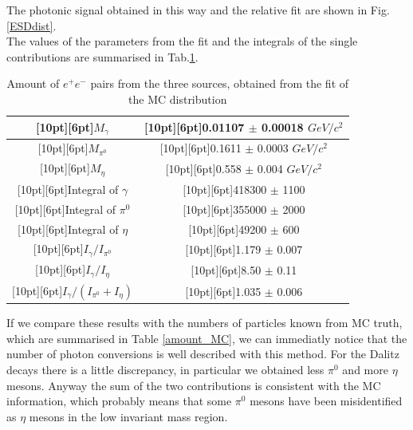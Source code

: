 \documentclass[a4paper,twocolumn,gsifonts,twoside]{gsipaper}
\begin{document}
The photonic signal obtained in this way and the relative fit are shown in Fig. \ref{ESDdist}.\\

The values of the parameters from the fit and the integrals of the single contributions are summarised in Tab.\ref{fit}.
\begin{table}[htpb]
\center
\caption{Amount of $e^{+}e^{-}$ pairs from the three sources, obtained from the fit of the MC distribution}\label{fit}
\begin{tabular}{|c|c|}
  \hline
  \raisebox{0pt}[10pt][6pt]{$M_{\gamma}$} &
  \raisebox{0pt}[10pt][6pt]{0.01107 $\pm$ 0.00018 $GeV/c^{2}$} \\
  \hline
  \raisebox{0pt}[10pt][6pt]{$M_{\pi^{0}}$} &
  \raisebox{0pt}[10pt][6pt]{0.1611 $\pm$ 0.0003 $GeV/c^{2}$} \\
  \hline
  \raisebox{0pt}[10pt][6pt]{$M_{\eta}$} &
  \raisebox{0pt}[10pt][6pt]{0.558 $\pm$ 0.004 $GeV/c^{2}$} \\
  \hline
  \raisebox{0pt}[10pt][6pt]{Integral of $\gamma$ } &
  \raisebox{0pt}[10pt][6pt]{418300 $\pm$ 1100} \\
  \hline
  \raisebox{0pt}[10pt][6pt]{Integral of $\pi^{0}$ } &
  \raisebox{0pt}[10pt][6pt]{355000 $\pm$ 2000} \\
  \hline
  \raisebox{0pt}[10pt][6pt]{Integral of $\eta$ } &
  \raisebox{0pt}[10pt][6pt]{49200 $\pm$ 600} \\
  \hline
  \raisebox{0pt}[10pt][6pt]{$I_{\gamma}/I_{\pi^{0}}$} &
  \raisebox{0pt}[10pt][6pt]{1.179 $\pm$ 0.007} \\
  \hline
  \raisebox{0pt}[10pt][6pt]{$I_{\gamma}/I_{\eta}$} &
  \raisebox{0pt}[10pt][6pt]{8.50 $\pm$ 0.11} \\
  \hline
  \raisebox{0pt}[10pt][6pt]{$I_{\gamma}/(I_{\pi^{0}}+I_{\eta})$} &
  \raisebox{0pt}[10pt][6pt]{1.035 $\pm$ 0.006} \\
  \hline
  \end{tabular}
\end{table}

If we compare these results with the numbers of particles known from MC truth, which are summarised in Table \ref{amount_MC}, we can 
immediatly notice that the number of photon conversions is well described with this method. For the Dalitz decays there is a little
discrepancy, in particular we obtained less $\pi^{0}$ and more $\eta$ mesons. Anyway the sum of the two contributions is consistent 
with the MC information, which probably means that some $\pi^{0}$ mesons have been misidentified as $\eta$ mesons in the low invariant 
mass region.
\end{document}
